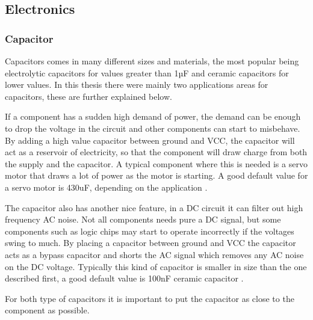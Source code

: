 \subsection{Electronics}
\subsubsection{Capacitor}
\label{sec:capacitor}
Capacitors comes in many different sizes and materials, the most popular being electrolytic capacitors for values greater than 1µF and ceramic capacitors for lower values. In this thesis there were mainly two applications areas for capacitors, these are further explained below.

If a component has a sudden high demand of power, the demand can be enough to drop the voltage in the circuit and other components can start to misbehave. By adding a high value capacitor between ground and VCC, the capacitor will act as a reservoir of electricity, so that the component will draw charge from both the supply and the capacitor. A typical component where this is needed is a servo motor that draws a lot of power as the motor is starting. A good default value for a servo motor is 430uF, depending on the application \cite{highcapacitor}.

The capacitor also has another nice feature, in a DC circuit it can filter out high frequency AC noise. Not all components needs pure a DC signal, but some components such as logic chips may start to operate incorrectly if the voltages swing to much. By placing a capacitor between ground and VCC the capacitor acts as a bypass capacitor and shorts the AC signal which removes any AC noise on the DC voltage. Typically this kind of capacitor is smaller in size than the one described first, a good default value is 100nF ceramic capacitor \cite{lowcapacitor}.

For both type of capacitors it is important to put the capacitor as close to the component as possible.